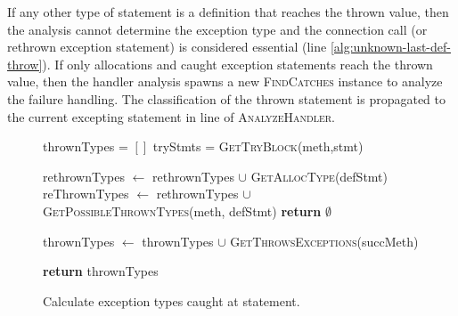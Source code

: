 If any other type of statement is a definition that reaches the thrown
value, then the analysis cannot determine the exception type and the
connection call (or rethrown exception statement) is considered
essential (line \ref{alg:unknown-last-def-throw}).  If only
allocations and caught exception statements reach the thrown value,
then the handler analysis spawns a new \textsc{FindCatches} instance
to analyze the failure handling.  The classification of the thrown
statement is propagated to the current excepting statement in
line \label{alg:progagate-line} of \textsc{AnalyzeHandler}.

\begin{figure}[t]
\begin{algorithmic}[1]
\scriptsize
{}
\State thrownTypes = $[]$
\State tryStmts = \textsc{GetTryBlock}(meth,stmt)



\State rethrownTypes $\gets$ rethrownTypes $\cup$ 
\State \hspace{1cm} \textsc{GetAllocType}(defStmt)
\State reThrownTypes $\gets$ rethrownTypes $\cup$
\State \hspace{1cm} \textsc{GetPossibleThrownTypes}(meth, defStmt)
\Else 
\State \textbf{return} $\emptyset$
\label{alg:getpossiblethrown-return-null}
\EndIf
\EndFor


\State thrownTypes $\gets$ thrownTypes $\cup$ 
\State \hspace{1cm}\textsc{GetThrowsExceptions}(succMeth)
\EndFor

\EndIf

\EndFor

\State \textbf{return} thrownTypes

\EndProcedure
\end{algorithmic}
\caption{Calculate exception types caught at statement.\label{alg:GetPossibleThrownTypes}}
  \vspace{-0.1in}
\end{figure}

